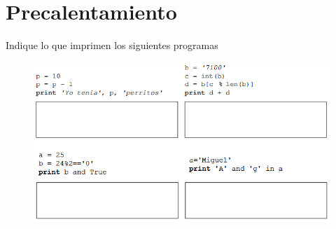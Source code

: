 \section{Precalentamiento}
Indique lo que imprimen los siguientes programas
\begin{figure}[h]
	\includegraphics{imagenes/ejercicio1.png}
\end{figure}